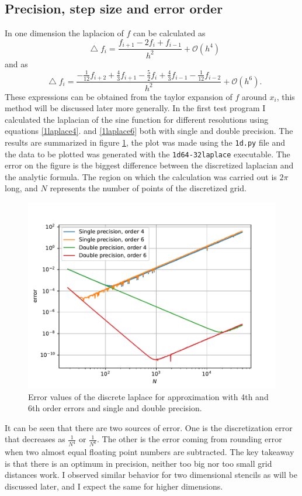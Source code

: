 \documentclass[pdftex,12pt,a4paper]{article}
\newcommand*\Laplace{\mathop{}\!\mathbin\bigtriangleup}
\begin{document}
	\subsection{Precision, step size and error order}
		\label{1dtest}
		In one dimension the laplacion of $f$ can be calculated as
		\begin{equation}
			\Laplace f_i = \frac{f_{i+1} - 2f_i + f_{i-1}}{h^2} + \mathcal{O}(h^4)
			\label{1laplace4}
		\end{equation}
		and as
		\begin{equation}
			\Laplace f_i = \frac{-\frac{1}{12}f_{i+2} + \frac{4}{3}f_{i+1} - \frac{5}{2}f_i + \frac{4}{3}f_{i-1} - \frac{1}{12}f_{i-2}}{h^2} + \mathcal{O}(h^6).
			\label{1laplace6}
		\end{equation}
		These expressions can be obtained from the taylor expansion of $f$ around $x_i$, this method will be discussed later more generally. In the first test program I calculated the laplacian of the sine function for different resolutions using equations \ref{1laplace4}. and \ref{1laplace6} both with single and double precision. The results are summarized in figure \ref{1dpdf}, the plot was made using the \texttt{1d.py} file and the data to be plotted was generated with the \texttt{1d64-32laplace} executable. The error on the figure is the biggest difference between the discretized laplacian and the analytic formula. The region on which the calculation was carried out is $2\pi$ long, and $N$ represents the number of points of the discretized grid.
		\begin{figure}[H]
			\centering
			\includegraphics[scale=1]{./figs/1d.pdf}
			\caption{Error values of the discrete laplace for approximation with 4th and 6th order errors and single and double precision. }
			\label{1dpdf}
		\end{figure}
		It can be seen that there are two sources of error. One is the discretization error that decreases as $\frac{1}{N^4}$ or $\frac{1}{N^6}$. The other is the error coming from rounding error when two almost equal floating point numbers are subtracted. The key takeaway is that there is an optimum in precision, neither too big nor too small grid distances work. I observed similar behavior for two dimensional stencils as will be discussed later, and I expect the same for higher dimensions.
\end{document}
